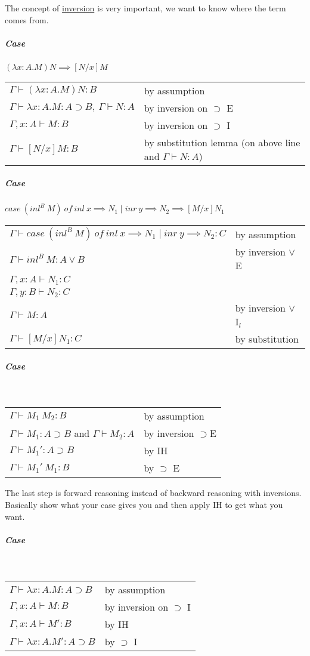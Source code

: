 \documentclass[12 pt]{article}
\begin{document}
	The concept of \underline{inversion} is very important, we want to
	know where the term comes from.
	\subparagraph{Case} $(\lambda x : A.M) N \implies [N/x] M$
	\\\begin{tabular}{l l}
		$\Gamma \vdash (\lambda x : A . M) N : B$ & by assumption
		\\ $\Gamma \vdash \lambda x: A.M : A \supset B,\ \Gamma \vdash N :
		A$                                        & by inversion on $\supset$ E
		\\ $\Gamma, x : A \vdash M : B$ & by inversion on $\supset$ I
		\\ $\Gamma \vdash [N/x]M:B$ & by substitution lemma (on above line
		and $\Gamma \vdash N:A$)
	\end{tabular}
	\subparagraph{Case} $case\ (inl^B \ M) \ of \ inl\ x \implies N_1
\mid inr\ y \implies N_2 \implies [M/x] N_1$
	\\\begin{tabular}{l l}
		$\Gamma \vdash case\ (inl^B \ M) \ of \ inl\ x \implies N_1
		\mid inr\ y \implies N_2 : C $ & by assumption
		\\ $\Gamma \vdash inl^B \ M : A \lor B$ & by inversion $\lor$ E
		\\ $\Gamma, x:A \vdash N_1 : C$
		\\ $\Gamma, y:B \vdash N_2 : C$
		\\ $\Gamma \vdash M:A$ & by inversion $\lor$ I$_l$
		\\ $\Gamma \vdash [M/x]N_1 : C$ & by substitution
	\end{tabular}
	\subparagraph{Case} 
	\DP
	\\
	\begin{tabular}{l l}
		$\Gamma \vdash M_1 \ M_2 : B$ & by assumption
		\\ $\Gamma \vdash M_1 : A \supset B$ and $\Gamma \vdash M_2 : A$ & by inversion $\supset$E
		\\ $\Gamma \vdash M_1' : A \supset B$ & by IH
		\\ $\Gamma \vdash M_1'\ M_1 : B$ & by $\supset$ E
	\end{tabular}
	The last step is forward reasoning instead of backward reasoning
	with inversions. Basically show what your case gives you and
	then apply IH to get what you want.
	\subparagraph{Case}
	\DP
	\\\begin{tabular}{l l}
		$\Gamma \vdash \lambda x : A . M : A \supset B$ & by assumption
		\\ $\Gamma, x : A \vdash M:B$ & by inversion on $\supset$ I
		\\ $\Gamma, x:A \vdash M' : B$ & by IH
		\\ $\Gamma \vdash \lambda x : A . M' : A \supset B$ & by $\supset$ I
	\end{tabular}
\end{document}
